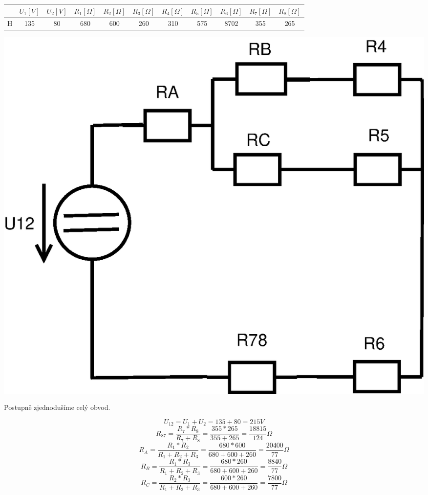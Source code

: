 \documentclass[a4paper, 12pt]{article}
\begin{document}
\vspace{1mm}
\begin{tabular}{|c|c|c|c|c|c|c|c|c|c|c|}
    \hline
     & $U_1 [V]$ &$ U_2 [V] $& $R_1[\Omega] $&$ R_2[\Omega] $&$ R_3[\Omega] $&$ R_4[\Omega] $&$ R_5[\Omega] $&$ R_6[\Omega] $&$ R_7[\Omega] $&$ R_8 [\Omega] $
     \\
     \hline
    H & 135 & 80 & 680 & 600 & 260 & 310 & 575 & 8702 & 355 & 265  
    \\
    \hline
\end{tabular}
\vspace{1mm}
\includegraphics[scale=0.4]{pr1/Diagram2.eps}

Postupně zjednodušíme celý obvod.

$$ U_{12} = U_1 + U_2 = 135 + 80 = 215 V $$
\vspace{1mm}
$$ R_{87} = \frac{R_7 * R_8}{R_7 + R_8} = \frac{355 * 265}{355 + 265} = \frac{18815}{124} \Omega $$
\vspace{1mm}
$$ R_A = \frac{R_1 * R_2}{R_1 + R_2 + R_3} = \frac{680 * 600}{680 + 600 +260} = \frac{20400}{77}\Omega $$
\vspace{1mm}
$$ R_B = \frac{R_1 * R_3}{R_1 + R_2 + R_3} = \frac{680 * 260}{680 + 600 +260} = \frac{8840}{77}\Omega $$
\vspace{1mm}
$$ R_C = \frac{R_2 * R_3}{R_1 + R_2 + R_3} = \frac{600 * 260}{680 + 600 +260} = \frac{7800}{77}\Omega $$
\vspace{1mm}
\end{document}
